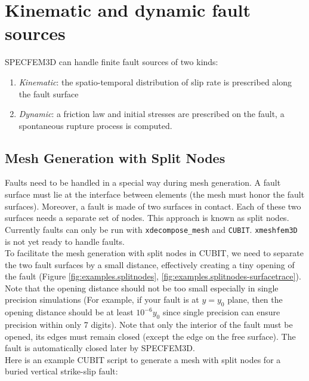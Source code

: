 \chapter{Kinematic and dynamic fault sources}\label{cha:Fault-Kinematics-Dynamics}

SPECFEM3D can handle finite fault sources of two kinds:
\begin{enumerate}
\item \emph{Kinematic}: the spatio-temporal distribution of slip rate is
prescribed along the fault surface
\item \emph{Dynamic}: a friction law and initial stresses are prescribed
on the fault, a spontaneous rupture process is computed.
\end{enumerate}

\section{Mesh Generation with Split Nodes}\label{sec:Mesh-Generation-with}

Faults need to be handled in a special way during mesh generation.
A fault surface must lie at the interface between elements (the mesh
must honor the fault surfaces). Moreover, a fault is made of two surfaces
in contact. Each of these two surfaces needs a separate set of nodes.
This approach is known as \textquotedbl{}split nodes\textquotedbl{}.
Currently faults can only be run with \texttt{xdecompose\_mesh} and
\texttt{CUBIT}. \texttt{xmeshfem3D} is not yet ready to handle faults.\\


To facilitate the mesh generation with split nodes in CUBIT, we need
to separate the two fault surfaces by a small distance, effectively
creating a tiny opening of the fault (Figure \ref{fig:examples.splitnodes},
\ref{fig:examples.splitnodes-surfacetrace}). Note that the opening distance 
should not be too small especially in single precision simulations 
(For example, if your fault is at $y=y_0$ plane, then the opening distance 
should be at least $10^{-6}y_0$ since single precision can ensure precision
within only 7 digits). Note that only the interior
of the fault must be opened, its edges must remain closed (except
the edge on the free surface). The fault is automatically closed later
by SPECFEM3D.\\

\noindent
Here is an example CUBIT script to generate a mesh with split nodes
for a buried vertical strike-slip fault:

